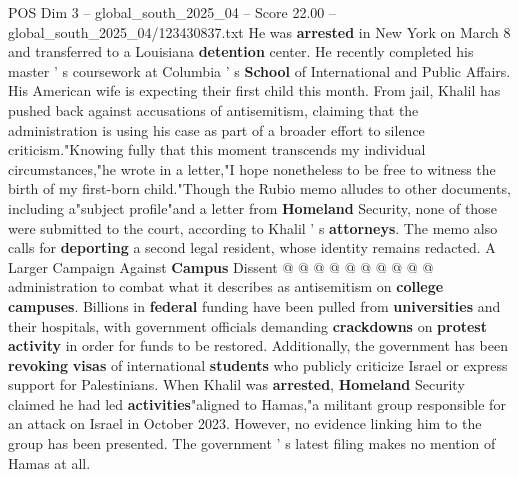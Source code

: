 \begin{textsample}{POS Dim 3 – global\_south\_2025\_04 – Score 22.00 – global\_south\_2025\_04/123430837.txt}
He was \textbf{arrested} in New York on March 8 and transferred to a Louisiana \textbf{detention} center.
He recently completed his master ' s coursework at Columbia ' s \textbf{School} of International and Public Affairs.
His American wife is expecting their first child this month.
From jail, Khalil has pushed back against accusations of antisemitism, claiming that the administration is using his case as part of a broader effort to silence criticism."Knowing fully that this moment transcends my individual circumstances,"he wrote in a letter,"I hope nonetheless to be free to witness the birth of my first-born child."Though the Rubio memo alludes to other documents, including a"subject profile"and a letter from \textbf{Homeland} Security, none of those were submitted to the court, according to Khalil ' s \textbf{attorneys}.
The memo also calls for \textbf{deporting} a second legal resident, whose identity remains redacted.
A Larger Campaign Against \textbf{Campus} Dissent @ @ @ @ @ @ @ @ @ @ administration to combat what it describes as antisemitism on \textbf{college} \textbf{campuses}.
Billions in \textbf{federal} funding have been pulled from \textbf{universities} and their hospitals, with government officials demanding \textbf{crackdowns} on \textbf{protest} \textbf{activity} in order for funds to be restored.
Additionally, the government has been \textbf{revoking} \textbf{visas} of international \textbf{students} who publicly criticize Israel or express support for Palestinians.
When Khalil was \textbf{arrested}, \textbf{Homeland} Security claimed he had led \textbf{activities}"aligned to Hamas,"a militant group responsible for an attack on Israel in October 2023.
However, no evidence linking him to the group has been presented.
The government ' s latest filing makes no mention of Hamas at all.

\end{textsample}
